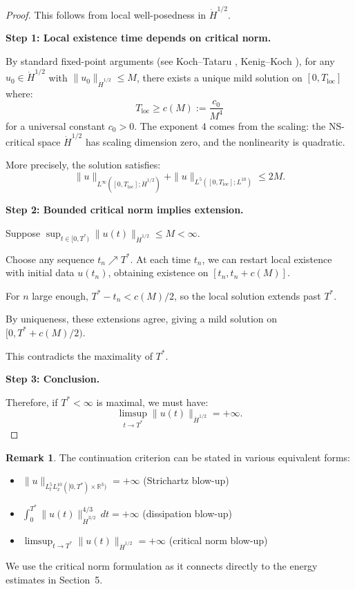 \documentclass[11pt]{article}
\theoremstyle{definition}
\newtheorem{remark}[theorem]{Remark}
\newcommand{\R}{\mathbb{R}}
\begin{document}
\begin{proof}
This follows from local well-posedness in $\dot{H}^{1/2}$.

\textbf{Step 1: Local existence time depends on critical norm.}

By standard fixed-point arguments (see Koch--Tataru \cite{KT}, Kenig--Koch \cite{KenigKoch}), for any $u_0 \in \dot{H}^{1/2}$ with $\|u_0\|_{\dot{H}^{1/2}} \leq M$, there exists a unique mild solution on $[0, T_{\text{loc}}]$ where:
\begin{equation}
T_{\text{loc}} \geq c(M) := \frac{c_0}{M^4}
\end{equation}
for a universal constant $c_0 > 0$. The exponent $4$ comes from the scaling: the NS-critical space $\dot{H}^{1/2}$ has scaling dimension zero, and the nonlinearity is quadratic.

More precisely, the solution satisfies:
\begin{equation}
\|u\|_{L^\infty([0,T_{\text{loc}}]; \dot{H}^{1/2})} + \|u\|_{L^5([0,T_{\text{loc}}]; L^{10})} \leq 2M.
\end{equation}

\textbf{Step 2: Bounded critical norm implies extension.}

Suppose $\sup_{t \in [0,T^*)} \|u(t)\|_{\dot{H}^{1/2}} \leq M < \infty$.

Choose any sequence $t_n \nearrow T^*$. At each time $t_n$, we can restart local existence with initial data $u(t_n)$, obtaining existence on $[t_n, t_n + c(M)]$.

For $n$ large enough, $T^* - t_n < c(M)/2$, so the local solution extends past $T^*$.

By uniqueness, these extensions agree, giving a mild solution on $[0, T^* + c(M)/2)$.

This contradicts the maximality of $T^*$.

\textbf{Step 3: Conclusion.}

Therefore, if $T^* < \infty$ is maximal, we must have:
\begin{equation}
\limsup_{t \to T^*} \|u(t)\|_{\dot{H}^{1/2}} = +\infty.
\end{equation}
\end{proof}

\begin{remark}
The continuation criterion can be stated in various equivalent forms:
\begin{itemize}
\item $\|u\|_{L^5_t L^{10}_x([0,T^*) \times \R^3)} = +\infty$ (Strichartz blow-up)
\item $\int_0^{T^*} \|u(t)\|_{\dot{H}^{3/2}}^{4/3} \, dt = +\infty$ (dissipation blow-up)
\item $\limsup_{t \to T^*} \|u(t)\|_{\dot{H}^{1/2}} = +\infty$ (critical norm blow-up)
\end{itemize}
We use the critical norm formulation as it connects directly to the energy estimates in Section~5.
\end{remark}
\end{document}
